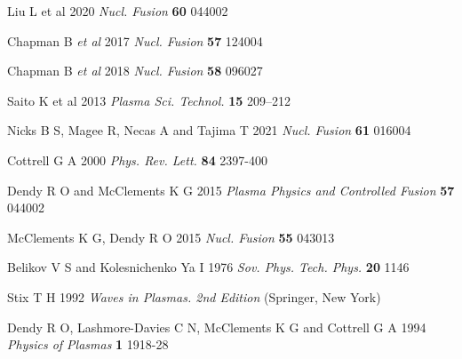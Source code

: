\documentclass[12pt]{iopart}
\begin{document}
\begin{thebibliography}{9}
Liu L et al 2020  \textit{Nucl. Fusion} \textbf{60} 044002

Chapman B \textit{et al} 2017 \textit{Nucl. Fusion} \textbf{57} 124004

Chapman B \textit{et al} 2018 \textit{Nucl. Fusion} \textbf{58} 096027

Saito K et al 2013 \textit{Plasma Sci. Technol.} \textbf{15} 209–212

Nicks B S, Magee R, Necas A and Tajima T 2021 \textit{Nucl. Fusion} \textbf{61} 016004

Cottrell G A 2000 \textit{Phys. Rev. Lett.} \textbf{84} 2397-400

Dendy R O and McClements K G 2015 \textit{Plasma Physics and Controlled Fusion} \textbf{57} 044002

McClements K G, Dendy R O 2015 \textit{Nucl. Fusion} \textbf{55} 043013

Belikov V S and Kolesnichenko Ya I 1976 \textit{Sov. Phys. Tech. Phys.} \textbf{20} 1146

Stix T H 1992 \textit{Waves in Plasmas. 2nd Edition} (Springer, New York)

Dendy R O, Lashmore-Davies C N, McClements K G and Cottrell G A 1994 \textit{Physics of Plasmas} \textbf{1} 1918-28


\end{thebibliography}
\end{document}
